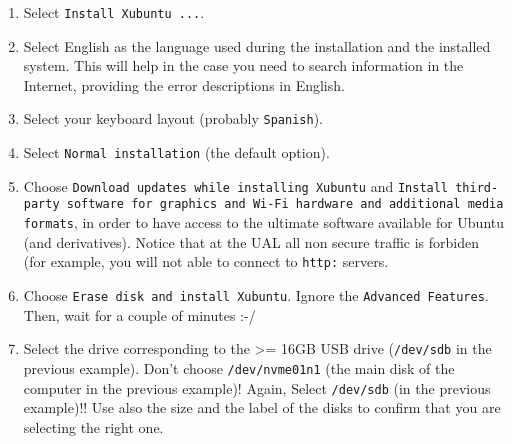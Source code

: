 \begin{enumerate}
\item Select \texttt{Install Xubuntu ...}.
  
\item Select English as the language used during the installation and the
  installed system. This will help in the case you need to search
  information in the Internet, providing the error descriptions in
  English.
  
\item Select your keyboard layout (probably \texttt{Spanish}).

%
%

\item Select \verb|Normal installation| (the default option).
  
\item Choose \texttt{Download updates while installing Xubuntu} and
  \texttt{Install third-party software for graphics and Wi-Fi hardware
    and additional media formats}, in order to have access to the
  ultimate software available for Ubuntu (and derivatives). Notice
  that at the UAL all non secure traffic is forbiden (for example, you
  will not able to connect to \verb|http:| servers.

\item Choose \texttt{Erase disk and install Xubuntu}. Ignore the
  \verb|Advanced Features|. Then, wait for a couple of minutes :-/

\item Select the drive corresponding to the >= 16GB USB drive
  (\texttt{/dev/sdb} in the previous example). Don't choose
  \texttt{/dev/nvme01n1} (the main disk of the computer in the
  previous example)! Again, Select \texttt{/dev/sdb} (in the previous
  example)!! Use also the size and the label of the disks to confirm
  that you are selecting the right one.


\end{enumerate}
